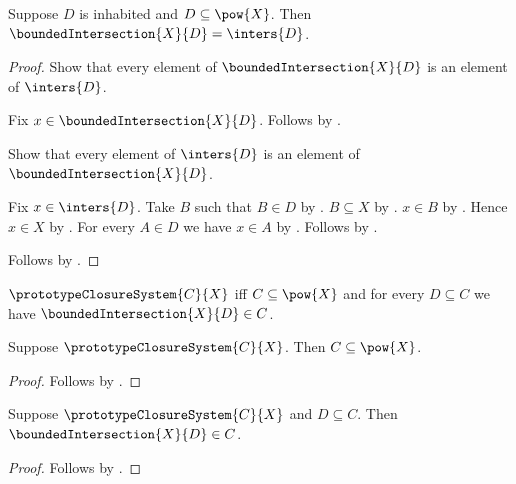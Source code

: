 \begin{proposition}\label{spike_bounded_intersection_eq_inters}
    Suppose $D$ is inhabited and $D\subseteq\pow{X}$.
    Then $\boundedIntersection{X}{D}=\inters{D}$.
\end{proposition}
\begin{proof}
    Show that every element of $\boundedIntersection{X}{D}$ is an element of
        $\inters{D}$.
    \begin{subproof}
        Fix $x\in\boundedIntersection{X}{D}$.
        Follows by
            .
    \end{subproof}
    Show that every element of $\inters{D}$ is an element of
        $\boundedIntersection{X}{D}$.
    \begin{subproof}
        Fix $x\in\inters{D}$.
        Take $B$ such that $B\in D$ by \auto.
        $B\subseteq X$ by .
        $x\in B$ by .
        Hence $x\in X$ by .
        For every $A\in D$ we have $x\in A$ by
            .
        Follows by .
    \end{subproof}
    Follows by .
\end{proof}

\begin{definition}\label{spike_prototype_closure_system}
    $\prototypeClosureSystem{C}{X}$ iff
        $C\subseteq\pow{X}$ and
        for every $D\subseteq C$ we have
            $\boundedIntersection{X}{D}\in C$.
\end{definition}

\begin{proposition}\label{spike_prototype_closure_system_bounded}
    Suppose $\prototypeClosureSystem{C}{X}$.
    Then $C\subseteq\pow{X}$.
\end{proposition}
\begin{proof}
    Follows by .
\end{proof}

\begin{proposition}\label{spike_prototype_closure_system_intersection}
    Suppose $\prototypeClosureSystem{C}{X}$ and $D\subseteq C$.
    Then $\boundedIntersection{X}{D}\in C$.
\end{proposition}
\begin{proof}
    Follows by .
\end{proof}

